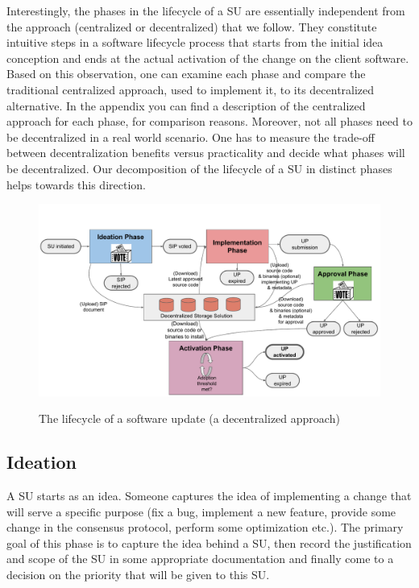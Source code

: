 Interestingly, the phases in the lifecycle of a SU are essentially independent from the approach (centralized or decentralized) that we follow. They constitute intuitive steps in a software lifecycle process that starts from the initial idea conception and ends at the actual activation of the change on the client software. Based on this observation, one can examine each phase and compare the traditional centralized approach, used to implement it, to its decentralized alternative. In the appendix  you can find a description of the centralized approach for each phase, for comparison reasons. Moreover, not all phases need to be decentralized in a real world scenario. One has to measure the trade-off between decentralization benefits versus practicality and decide what phases will be decentralized. Our decomposition of the lifecycle of a SU in distinct phases helps towards this direction.

\begin{figure}[h!] %
    \caption{The lifecycle of a software update (a decentralized approach)}
    \centering
    \includegraphics[width=1.0 \columnwidth,keepaspectratio]{figures/lifecycle_phases.pdf}
    \label{lifecycle}
\end{figure}

\subsection{Ideation}
A SU starts as an idea. Someone captures the idea of implementing a change that will serve a specific purpose (fix a bug, implement a new feature, provide some change in the consensus protocol, perform some optimization etc.). The primary goal of this phase is to capture the idea behind a SU, then record the justification and scope of the SU in some appropriate documentation and finally come to a decision on the priority that will be given to this SU. 

